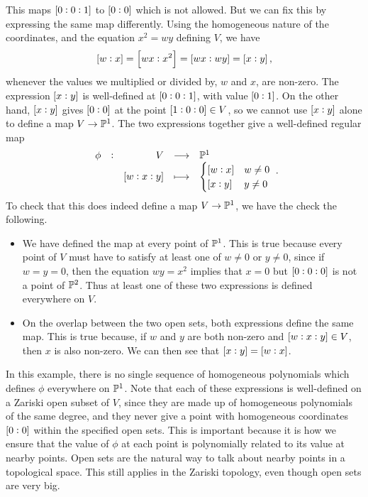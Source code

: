 \begin{example*}
This maps $ \sbr{0 : 0 : 1} $ to $ \sbr{0 : 0} $ which is not allowed. But we can fix this by expressing the same map differently. Using the homogeneous nature of the coordinates, and the equation $ x^2 = wy $ defining $ V $, we have
$$ \sbr{w : x} = \sbr{wx : x^2} = \sbr{wx : wy} = \sbr{x : y}, $$
whenever the values we multiplied or divided by, $ w $ and $ x $, are non-zero. The expression $ \sbr{x : y} $ is well-defined at $ \sbr{0 : 0 : 1} $, with value $ \sbr{0 : 1} $. On the other hand, $ \sbr{x : y} $ gives $ \sbr{0 : 0} $ at the point $ \sbr{1 : 0 : 0} \in V $, so we cannot use $ \sbr{x : y} $ alone to define a map $ V \to \mathbb{P}^1 $. The two expressions together give a well-defined regular map
$$ \function[\phi]{V}{\PP^1}{\sbr{w : x : y}}{
\begin{cases}
\sbr{w : x} & w \ne 0 \\
\sbr{x : y} & y \ne 0
\end{cases}
}. $$
To check that this does indeed define a map $ V \to \mathbb{P}^1 $, we have the check the following.
\begin{itemize}
\item We have defined the map at every point of $ \mathbb{P}^1 $. This is true because every point of $ V $ must have to satisfy at least one of $ w \ne 0 $ or $ y \ne 0 $, since if $ w = y = 0 $, then the equation $ wy = x^2 $ implies that $ x = 0 $ but $ \sbr{0 : 0 : 0} $ is not a point of $ \mathbb{P}^2 $. Thus at least one of these two expressions is defined everywhere on $ V $.
\item On the overlap between the two open sets, both expressions define the same map. This is true because, if $ w $ and $ y $ are both non-zero and $ \sbr{w : x : y} \in V $, then $ x $ is also non-zero. We can then see that $ \sbr{x : y} = \sbr{w : x} $.
\end{itemize}
In this example, there is no single sequence of homogeneous polynomials which defines $ \phi $ everywhere on $ \mathbb{P}^1 $. Note that each of these expressions is well-defined on a Zariski open subset of $ V $, since they are made up of homogeneous polynomials of the same degree, and they never give a point with homogeneous coordinates $ \sbr{0 : 0} $ within the specified open sets. This is important because it is how we ensure that the value of $ \phi $ at each point is polynomially related to its value at nearby points. Open sets are the natural way to talk about nearby points in a topological space. This still applies in the Zariski topology, even though open sets are very big.
\end{example*}

